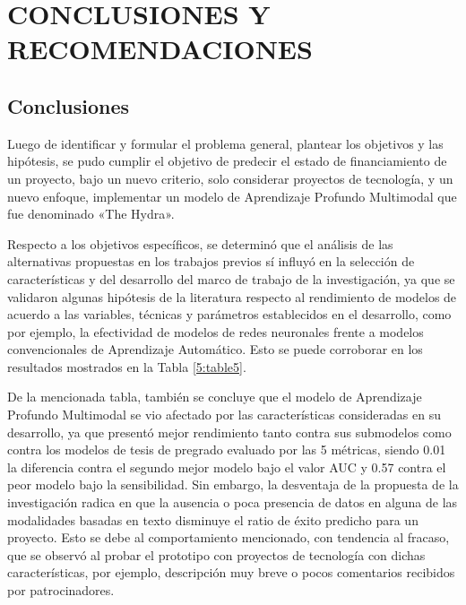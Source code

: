 \chapter{CONCLUSIONES Y RECOMENDACIONES}
\section{Conclusiones}
Luego de identificar y formular el problema general, plantear los objetivos y las hipótesis, se pudo cumplir el objetivo de predecir el estado de financiamiento de un proyecto, bajo un nuevo criterio, solo considerar proyectos de tecnología, y un nuevo enfoque, implementar un modelo de Aprendizaje Profundo Multimodal que fue denominado «The Hydra».

Respecto a los objetivos específicos, se determinó que el análisis de las alternativas propuestas en los trabajos previos sí influyó en la selección de características y del desarrollo del marco de trabajo de la investigación, ya que se validaron algunas hipótesis de la literatura respecto al rendimiento de modelos de acuerdo a las variables, técnicas y parámetros establecidos en el desarrollo, como por ejemplo, la efectividad de modelos de redes neuronales frente a modelos convencionales de Aprendizaje Automático. Esto se puede corroborar en los resultados mostrados en la Tabla \ref{5:table5}.

De la mencionada tabla, también se concluye que el modelo de Aprendizaje Profundo Multimodal se vio afectado por las características consideradas en su desarrollo, ya que presentó mejor rendimiento tanto contra sus submodelos como contra los modelos de tesis de pregrado evaluado por las 5 métricas, siendo 0.01 la diferencia contra el segundo mejor modelo bajo el valor AUC y 0.57 contra el peor modelo bajo la sensibilidad. Sin embargo, la desventaja de la propuesta de la investigación radica en que la ausencia o poca presencia de datos en alguna de las modalidades basadas en texto disminuye el ratio de éxito predicho para un proyecto. Esto se debe al comportamiento mencionado, con tendencia al fracaso, que se observó al probar el prototipo con proyectos de tecnología con dichas características, por ejemplo, descripción muy breve o pocos comentarios recibidos por patrocinadores.


